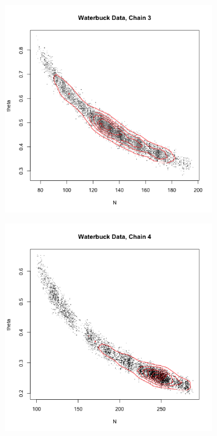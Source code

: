 \documentclass[10pt,psamsfonts]{amsart}
\theoremstyle{definition}
\theoremstyle{remark}
\numberwithin{equation}{section}
\begin{document}
\begin{figure}
\begin{subfigure}[b]{0.3\textwidth}
	\end{subfigure}
	\begin{subfigure}[b]{0.3\textwidth}
		\includegraphics[width=\textwidth]{wonlee_mcmc_waterbuck_3.png}
	\end{subfigure}
	\begin{subfigure}[b]{0.3\textwidth}
		\includegraphics[width=\textwidth]{wonlee_mcmc_waterbuck_4.png}

\end{subfigure}
\end{figure}
\end{document}
